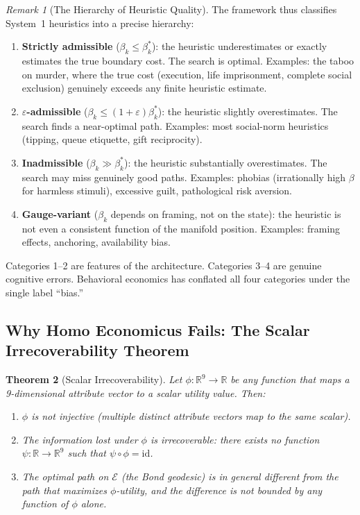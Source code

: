 \documentclass[12pt]{article}
\newtheorem{theorem}{Theorem}[section]
\theoremstyle{definition}
\theoremstyle{remark}
\newtheorem{remark}[theorem]{Remark}
\newcommand{\E}{\mathcal{E}}               %
\newcommand{\R}{\mathbb{R}}
\begin{document}
\begin{remark}[The Hierarchy of Heuristic Quality]
The framework thus classifies System~1 heuristics into a precise hierarchy:
\begin{enumerate}
    \item \textbf{Strictly admissible} ($\beta_k \leq \beta_k^*$): the heuristic underestimates or exactly estimates the true boundary cost.  The search is optimal.  Examples: the taboo on murder, where the true cost (execution, life imprisonment, complete social exclusion) genuinely exceeds any finite heuristic estimate.
    \item \textbf{$\varepsilon$-admissible} ($\beta_k \leq (1+\varepsilon)\beta_k^*$): the heuristic slightly overestimates.  The search finds a near-optimal path.  Examples: most social-norm heuristics (tipping, queue etiquette, gift reciprocity).
    \item \textbf{Inadmissible} ($\beta_k \gg \beta_k^*$): the heuristic substantially overestimates.  The search may miss genuinely good paths.  Examples: phobias (irrationally high $\beta$ for harmless stimuli), excessive guilt, pathological risk aversion.
    \item \textbf{Gauge-variant} ($\beta_k$ depends on framing, not on the state): the heuristic is not even a consistent function of the manifold position.  Examples: framing effects, anchoring, availability bias.
\end{enumerate}
Categories 1--2 are features of the architecture.  Categories 3--4 are genuine cognitive errors.  Behavioral economics has conflated all four categories under the single label ``bias.''
\end{remark}

\subsection{Why Homo Economicus Fails: The Scalar Irrecoverability Theorem}

\begin{theorem}[Scalar Irrecoverability]
\label{thm:irrecoverability}
Let $\phi: \R^9 \to \R$ be any function that maps a 9-dimensional attribute vector to a scalar utility value.  Then:
\begin{enumerate}
    \item $\phi$ is not injective (multiple distinct attribute vectors map to the same scalar).
    \item The information lost under $\phi$ is \emph{irrecoverable}: there exists no function $\psi: \R \to \R^9$ such that $\psi \circ \phi = \text{id}$.
    \item The optimal path on $\E$ (the Bond geodesic) is in general \emph{different} from the path that maximizes $\phi$-utility, and the difference is not bounded by any function of $\phi$ alone.
\end{enumerate}
\end{theorem}
\end{document}
